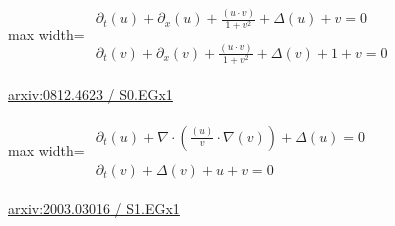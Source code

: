 \documentclass[10pt,a4paper]{article}
\begin{document}
\begin{minipage}{\linewidth}
\begin{center}\begin{adjustbox}{max width=\linewidth}$\displaystyle\begin{gathered}\begin{gathered}\partial_{t}(u)+\partial_{x}(u)+\frac{(u\cdot v)}{1+v^{2}}+\Delta(u)+v=0\end{gathered}\\[5pt]\begin{gathered}\partial_{t}(v)+\partial_{x}(v)+\frac{(u\cdot v)}{1+v^{2}}+\Delta(v)+1+v=0\end{gathered}\end{gathered}$\end{adjustbox}\end{center}
{\small \href{https://arxiv.org/html/0812.4623#S0.EGx1}{arxiv:0812.4623 / S0.EGx1}}\par
\end{minipage}\par\vspace{7mm}

\begin{minipage}{\linewidth}
\begin{center}\begin{adjustbox}{max width=\linewidth}$\displaystyle\begin{gathered}\begin{gathered}\partial_{t}(u)+\nabla\cdot(\frac{(u)}{v}\cdot \nabla(v))+\Delta(u)=0\end{gathered}\\[5pt]\begin{gathered}\partial_{t}(v)+\Delta(v)+u+v=0\end{gathered}\end{gathered}$\end{adjustbox}\end{center}
{\small \href{https://arxiv.org/html/2003.03016#S1.EGx1}{arxiv:2003.03016 / S1.EGx1}}\par
\end{minipage}\par\vspace{7mm}
\end{document}
